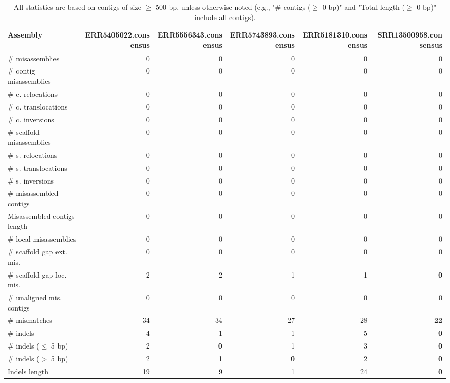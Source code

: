 \documentclass[12pt,a4paper]{article}
\begin{document}
\begin{table}[ht]
\begin{center}
\caption{All statistics are based on contigs of size $\geq$ 500 bp, unless otherwise noted (e.g., "\# contigs ($\geq$ 0 bp)" and "Total length ($\geq$ 0 bp)" include all contigs).}
\begin{tabular}{|l*{5}{|r}|}
\hline
Assembly & ERR5405022.consensus & ERR5556343.consensus & ERR5743893.consensus & ERR5181310.consensus & SRR13500958.consensus \\ \hline
\# misassemblies & 0 & 0 & 0 & 0 & 0 \\ \hline
\hspace{2mm}\# contig misassemblies & 0 & 0 & 0 & 0 & 0 \\ \hline
\hspace{5mm}\# c. relocations & 0 & 0 & 0 & 0 & 0 \\ \hline
\hspace{5mm}\# c. translocations & 0 & 0 & 0 & 0 & 0 \\ \hline
\hspace{5mm}\# c. inversions & 0 & 0 & 0 & 0 & 0 \\ \hline
\hspace{2mm}\# scaffold misassemblies & 0 & 0 & 0 & 0 & 0 \\ \hline
\hspace{5mm}\# s. relocations & 0 & 0 & 0 & 0 & 0 \\ \hline
\hspace{5mm}\# s. translocations & 0 & 0 & 0 & 0 & 0 \\ \hline
\hspace{5mm}\# s. inversions & 0 & 0 & 0 & 0 & 0 \\ \hline
\# misassembled contigs & 0 & 0 & 0 & 0 & 0 \\ \hline
Misassembled contigs length & 0 & 0 & 0 & 0 & 0 \\ \hline
\# local misassemblies & 0 & 0 & 0 & 0 & 0 \\ \hline
\# scaffold gap ext. mis. & 0 & 0 & 0 & 0 & 0 \\ \hline
\# scaffold gap loc. mis. & 2 & 2 & 1 & 1 & {\bf 0} \\ \hline
\# unaligned mis. contigs & 0 & 0 & 0 & 0 & 0 \\ \hline
\# mismatches & 34 & 34 & 27 & 28 & {\bf 22} \\ \hline
\# indels & 4 & 1 & 1 & 5 & {\bf 0} \\ \hline
\hspace{5mm}\# indels ($\leq$ 5 bp) & 2 & {\bf 0} & 1 & 3 & {\bf 0} \\ \hline
\hspace{5mm}\# indels ($>$ 5 bp) & 2 & 1 & {\bf 0} & 2 & {\bf 0} \\ \hline
Indels length & 19 & 9 & 1 & 24 & {\bf 0} \\ \hline
\end{tabular}
\end{center}
\end{table}
\end{document}

